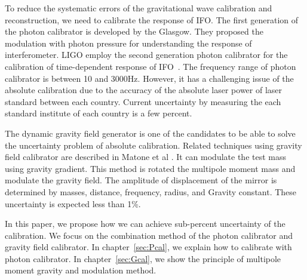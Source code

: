 \documentclass[A4]{spie}  %
\begin{document}
To reduce the systematic errors of the gravitational wave calibration and reconstruction, we need to calibrate the response of IFO. The first generation of the photon calibrator is developed by the Glasgow. They proposed the modulation with photon pressure for understanding the response of interferometer. LIGO employ the second generation photon calibrator for the calibration of time-dependent response of IFO~\cite{doi:10.1063/1.4967303}.  The frequency range of photon calibrator is between 10 and 3000Hz.  However, it has a challenging issue of the absolute calibration due to the accuracy of the absolute laser power of laser standard between each country. Current uncertainty by measuring the each standard institute of each country is a few percent.

The dynamic gravity field generator is one of the candidates to be able to solve the uncertainty problem of absolute calibration.  Related techniques using gravity field calibrator are described in Matone et al \cite{0264-9381-24-9-005}. It can modulate the test mass using gravity gradient. This method is rotated the multipole moment mass and modulate the gravity field. The amplitude of displacement of the mirror is determined by masses, distance, frequency, radius, and Gravity constant. These uncertainty is expected less than 1\%.

In this paper, we propose how we can achieve sub-percent uncertainty of the calibration. We focus on the combination method of the photon calibrator and gravity field calibrator.
In chapter~\ref{sec:Pcal}, we explain how to calibrate with photon calibrator. In chapter~\ref{sec:Gcal}, we show the principle of multipole moment gravity and modulation method.
\end{document}
